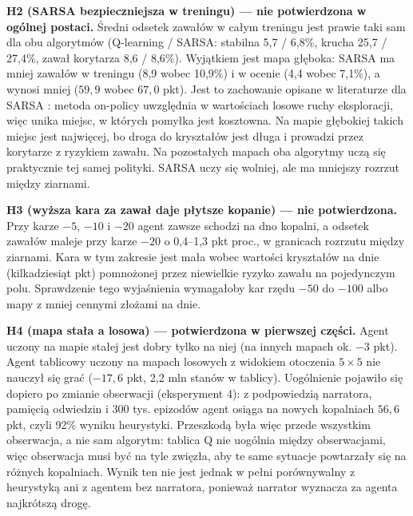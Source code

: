 \documentclass[11pt,a4paper]{article}
\begin{document}
\textbf{H2 (SARSA bezpieczniejsza w treningu) --- nie potwierdzona w ogólnej postaci.}
Średni odsetek zawałów w całym treningu jest prawie taki sam dla obu algorytmów
(Q-learning / SARSA: stabilna 5,7 / 6,8\%, krucha 25,7 / 27,4\%, zawał korytarza
8,6 / 8,6\%). Wyjątkiem jest mapa głęboka: SARSA ma mniej zawałów w treningu
(8,9 wobec 10,9\%) i w ocenie (4,4 wobec 7,1\%), a wynosi mniej ($59{,}9$ wobec
$67{,}0$ pkt). Jest to zachowanie opisane w literaturze dla SARSA \cite{sutton}: metoda
on-policy uwzględnia w wartościach losowe ruchy eksploracji, więc unika miejsc,
w których pomyłka jest kosztowna. Na mapie głębokiej takich miejsc jest najwięcej, bo
droga do kryształów jest długa i prowadzi przez korytarze z ryzykiem zawału. Na
pozostałych mapach oba algorytmy uczą się praktycznie tej samej polityki. SARSA uczy
się wolniej, ale ma mniejszy rozrzut między ziarnami.

\textbf{H3 (wyższa kara za zawał daje płytsze kopanie) --- nie potwierdzona.} Przy
karze $-5$, $-10$ i $-20$ agent zawsze schodzi na dno kopalni, a odsetek zawałów
maleje przy karze $-20$ o 0,4--1,3 pkt proc., w granicach rozrzutu między ziarnami.
Kara w tym zakresie jest mała wobec wartości kryształów na dnie (kilkadziesiąt pkt)
pomnożonej przez niewielkie ryzyko zawału na pojedynczym polu. Sprawdzenie tego
wyjaśnienia wymagałoby kar rzędu $-50$ do $-100$ albo mapy z mniej cennymi złożami
na dnie.

\textbf{H4 (mapa stała a losowa) --- potwierdzona w pierwszej części.} Agent uczony
na mapie stałej jest dobry tylko na niej (na innych mapach ok. $-3$ pkt). Agent
tablicowy uczony na mapach losowych z widokiem otoczenia $5\times5$ nie nauczył się
grać ($-17{,}6$ pkt, 2,2 mln stanów w tablicy). Uogólnienie pojawiło się dopiero po
zmianie obserwacji (eksperyment 4): z podpowiedzią narratora, pamięcią odwiedzin
i 300 tys. epizodów agent osiąga na nowych kopalniach $56{,}6$ pkt, czyli 92\%
wyniku heurystyki. Przeszkodą była więc przede wszystkim obserwacja, a nie sam
algorytm: tablica Q nie uogólnia między obserwacjami, więc obserwacja musi być na tyle
zwięzła, aby te same sytuacje powtarzały się na różnych kopalniach. Wynik ten nie jest
jednak w pełni porównywalny z heurystyką ani z agentem bez narratora, ponieważ
narrator wyznacza za agenta najkrótszą drogę.
\end{document}
